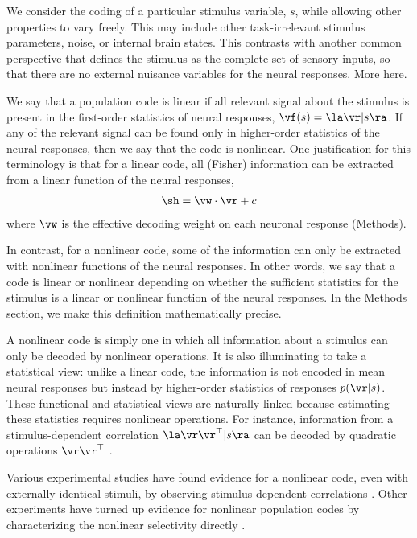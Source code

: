 \documentclass[11pt,twocolumn]{article}
\begin{document}
We consider the coding of a particular stimulus variable, $s$, while allowing other properties to vary freely. This may include other task-irrelevant stimulus parameters, noise, or internal brain states. This contrasts with another common perspective that defines the stimulus as the complete set of sensory inputs, so that there are no external nuisance variables for the neural responses. More here.

We say that a population code is linear if all relevant signal about the stimulus is present in the first-order statistics of neural responses, $\vf(s)=\la \vr|s\ra$. If any of the relevant signal can be found only in higher-order statistics of the neural responses, then we say that the code is nonlinear. One justification for this terminology is that for a linear code, all (Fisher) information can be extracted from a linear function of the neural responses,
\begin{align}
\sh=\vw\cdot\vr+c
\end{align}
where $\vw$ is the effective decoding weight on each neuronal response (Methods).

In contrast, for a nonlinear code, some of the information can only be extracted with nonlinear functions of the neural responses. In other words, we say that a code is linear or nonlinear depending on whether the sufficient statistics for the stimulus is a linear or nonlinear function of the neural responses. In the Methods section, we make this definition mathematically precise.

A nonlinear code is simply one in which all information about a stimulus can only be decoded by nonlinear operations. It is also illuminating to take a statistical view: unlike a linear code, the information is not encoded in mean neural responses but instead by higher-order statistics of responses $p(\vr|s)$. These functional and statistical views are naturally linked because estimating these statistics requires nonlinear operations. For instance, information from a stimulus-dependent correlation $\la\vr\vr^\top|s\ra$ can be decoded by quadratic operations $\vr\vr^\top$ \cite{shamir2006implications}.

Various experimental studies have found evidence for a nonlinear code, even with externally identical stimuli, by observing stimulus-dependent correlations \cite{kohn2005stimulus,averbeck2006effects,ohiorhenuan2010sparse}. Other experiments have turned up evidence for nonlinear population codes by characterizing the nonlinear selectivity directly \cite{rigotti2013importance,pagan2014dynamic,yamins2014performance}.
\end{document}
